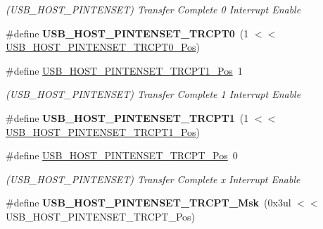 \begin{DoxyCompactItemize}
\begin{DoxyCompactList}\small\item\em (U\+S\+B\+\_\+\+H\+O\+S\+T\+\_\+\+P\+I\+N\+T\+E\+N\+S\+E\+T) Transfer Complete 0 Interrupt Enable \end{DoxyCompactList}\item 
\hypertarget{group___s_a_m_l21___u_s_b_ga242d35e07e6395f6086704468a22d0c0}{}\#define {\bfseries U\+S\+B\+\_\+\+H\+O\+S\+T\+\_\+\+P\+I\+N\+T\+E\+N\+S\+E\+T\+\_\+\+T\+R\+C\+P\+T0}~(1 $<$$<$ \hyperlink{group___s_a_m_l21___u_s_b_ga4b7651b4e3d83869c6c045765079992f}{U\+S\+B\+\_\+\+H\+O\+S\+T\+\_\+\+P\+I\+N\+T\+E\+N\+S\+E\+T\+\_\+\+T\+R\+C\+P\+T0\+\_\+\+Pos})\label{group___s_a_m_l21___u_s_b_ga242d35e07e6395f6086704468a22d0c0}

\item 
\hypertarget{group___s_a_m_l21___u_s_b_gabeb57796072c3677ac72065856f724fd}{}\#define \hyperlink{group___s_a_m_l21___u_s_b_gabeb57796072c3677ac72065856f724fd}{U\+S\+B\+\_\+\+H\+O\+S\+T\+\_\+\+P\+I\+N\+T\+E\+N\+S\+E\+T\+\_\+\+T\+R\+C\+P\+T1\+\_\+\+Pos}~1\label{group___s_a_m_l21___u_s_b_gabeb57796072c3677ac72065856f724fd}

\begin{DoxyCompactList}\small\item\em (U\+S\+B\+\_\+\+H\+O\+S\+T\+\_\+\+P\+I\+N\+T\+E\+N\+S\+E\+T) Transfer Complete 1 Interrupt Enable \end{DoxyCompactList}\item 
\hypertarget{group___s_a_m_l21___u_s_b_ga9b6597376ac082e59929c704546d5eb8}{}\#define {\bfseries U\+S\+B\+\_\+\+H\+O\+S\+T\+\_\+\+P\+I\+N\+T\+E\+N\+S\+E\+T\+\_\+\+T\+R\+C\+P\+T1}~(1 $<$$<$ \hyperlink{group___s_a_m_l21___u_s_b_gabeb57796072c3677ac72065856f724fd}{U\+S\+B\+\_\+\+H\+O\+S\+T\+\_\+\+P\+I\+N\+T\+E\+N\+S\+E\+T\+\_\+\+T\+R\+C\+P\+T1\+\_\+\+Pos})\label{group___s_a_m_l21___u_s_b_ga9b6597376ac082e59929c704546d5eb8}

\item 
\hypertarget{group___s_a_m_l21___u_s_b_gaa8d9cbab5a85407960e0d987baa97e88}{}\#define \hyperlink{group___s_a_m_l21___u_s_b_gaa8d9cbab5a85407960e0d987baa97e88}{U\+S\+B\+\_\+\+H\+O\+S\+T\+\_\+\+P\+I\+N\+T\+E\+N\+S\+E\+T\+\_\+\+T\+R\+C\+P\+T\+\_\+\+Pos}~0\label{group___s_a_m_l21___u_s_b_gaa8d9cbab5a85407960e0d987baa97e88}

\begin{DoxyCompactList}\small\item\em (U\+S\+B\+\_\+\+H\+O\+S\+T\+\_\+\+P\+I\+N\+T\+E\+N\+S\+E\+T) Transfer Complete x Interrupt Enable \end{DoxyCompactList}\item 
\hypertarget{group___s_a_m_l21___u_s_b_ga3f24e78627191f53e36e8784bd418f0b}{}\#define {\bfseries U\+S\+B\+\_\+\+H\+O\+S\+T\+\_\+\+P\+I\+N\+T\+E\+N\+S\+E\+T\+\_\+\+T\+R\+C\+P\+T\+\_\+\+Msk}~(0x3ul $<$$<$ U\+S\+B\+\_\+\+H\+O\+S\+T\+\_\+\+P\+I\+N\+T\+E\+N\+S\+E\+T\+\_\+\+T\+R\+C\+P\+T\+\_\+\+Pos)\label{group___s_a_m_l21___u_s_b_ga3f24e78627191f53e36e8784bd418f0b}


\end{DoxyCompactItemize}
